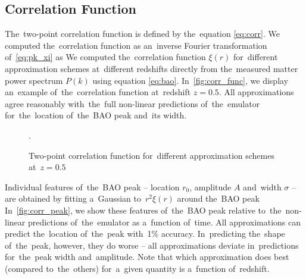 \subsection{Correlation Function}
\label{sec:corr}
The~two-point correlation function is defined by the~equation \eqref{eq:corr}. We computed the~correlation function as an~inverse Fourier transformation of~\eqref{eq:pk_xi} as
We computed the~correlation function $\xi(r)$ for~different approximation schemes at~different redshifts directly from the~measured matter power spectrum $P(k)$ using equation \eqref{eq:bao}. In~\autoref{fig:corr_func}, we display an~example of~the~correlation function at~redshift $z=0.5$. All approximations agree reasonably with~the~full non-linear predictions of~the~emulator for~the~location of~the~BAO peak and~its width.
\begin{figure}[bt]
\centering
	\begin{subfigure}{0.9\textwidth}
	\end{subfigure}
	\begin{subfigure}{0.9\textwidth}
		\centering
	\end{subfigure}
	\caption{Two-point correlation function for~different approximation schemes at~$z=0.5$}.
	\label{fig:corr_func}
\end{figure}

Individual features of~the~BAO peak -- location $r_0$, amplitude $A$ and~width $\sigma$ -- are obtained by fitting a~Gaussian to~$r^2\xi(r)$ around the~BAO peak
In~\autoref{fig:corr_peak}, we show these features of~the~BAO peak relative to~the~non-linear predictions of~the~emulator as a~function of~time. All approximations can predict the~location of~the~peak with~1\% accuracy. In~predicting the~shape of~the~peak, however, they do worse -- all approximations deviate in~predictions for~the~peak width and~amplitude. Note that which approximation does best (compared to~the~others) for~a~given quantity is a~function of~redshift.



